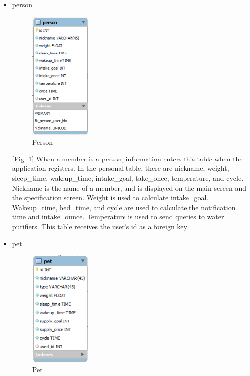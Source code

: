 \documentclass[conference]{IEEEtran}
\begin{document}
\begin{itemize}
\begin{enumerate}
\begin{itemize}
            [Fig. \ref{fig:db_user}] The user table includes index id, email, password, name, and mobile. These four values are essential values for membership. Email is a primary key and allows identification of the user, which is also used to find password. The password is used to log in or delete an account along with an email, and this value may be changed on the password search or password change screen. The name is the user's name and is also used to find password. Phone number is used to find ID.
            \item person
            \setlength{\parindent}{2ex}
            \par \begin{figure}[h!]
            \includegraphics[width=3cm]{image/db_person.jpg}
            \centering
            \caption{Person}
            \label{fig:db_person}
            \end{figure}
            
            [Fig. \ref{fig:db_person}] When a member is a person, information enters this table when the application registers. In the personal table, there are nickname, weight, sleep\_time, wakeup\_time, intake\_goal, take\_once, temperature, and cycle. Nickname is the name of a member, and is displayed on the main screen and the specification screen. Weight is used to calculate intake\_goal. Wakeup\_time, bed\_time, and cycle are used to calculate the notification time and intake\_ounce. Temperature is used to send queries to water purifiers. This table receives the user's id as a foreign key.
            \item pet
            \setlength{\parindent}{2ex}
            \par \begin{figure}[h!]
            \includegraphics[width=3cm]{image/db_pet.jpg}
            \centering
            \caption{Pet}
            \label{fig:db_pet}
            \end{figure}
            

\end{itemize}
\end{enumerate}
\end{itemize}
\end{document}
